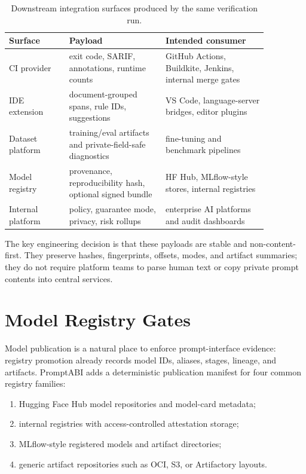 \documentclass[10pt]{article}
\begin{document}
\begin{table}[h]
\centering
\small
\begin{tabular}{p{0.2\linewidth}p{0.32\linewidth}p{0.34\linewidth}}
\toprule
Surface & Payload & Intended consumer \\
\midrule
CI provider & exit code, SARIF, annotations, runtime counts & GitHub Actions,
Buildkite, Jenkins, internal merge gates \\
IDE extension & document-grouped spans, rule IDs, suggestions & VS Code,
language-server bridges, editor plugins \\
Dataset platform & training/eval artifacts and private-field-safe diagnostics
& fine-tuning and benchmark pipelines \\
Model registry & provenance, reproducibility hash, optional signed bundle &
HF Hub, MLflow-style stores, internal registries \\
Internal platform & policy, guarantee mode, privacy, risk rollups & enterprise
AI platforms and audit dashboards \\
\bottomrule
\end{tabular}
\caption{Downstream integration surfaces produced by the same verification run.}
\label{tab:integration-surfaces}
\end{table}

The key engineering decision is that these payloads are stable and
non-content-first. They preserve hashes, fingerprints, offsets, modes, and
artifact summaries; they do not require platform teams to parse human text or
copy private prompt contents into central services.

\newpage
\section{Model Registry Gates}

Model publication is a natural place to enforce prompt-interface evidence:
registry promotion already records model IDs, aliases, stages, lineage, and
artifacts. PromptABI adds a deterministic publication manifest for four common
registry families:
\begin{enumerate}
  \item Hugging Face Hub model repositories and model-card metadata;
  \item internal registries with access-controlled attestation storage;
  \item MLflow-style registered models and artifact directories;
  \item generic artifact repositories such as OCI, S3, or Artifactory layouts.
\end{enumerate}
\end{document}
